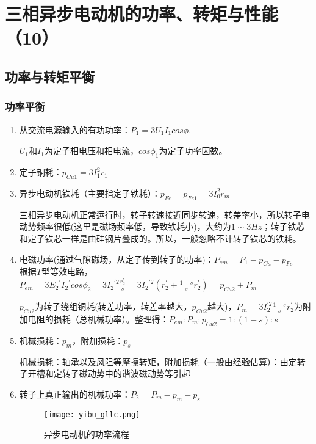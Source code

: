 \documentclass[blue]{elegantnote}
\begin{document}
\chapter{三相异步电动机的功率、转矩与性能（10）}
\section{功率与转矩平衡}
\subsection{功率平衡}
\begin{enumerate}
	\item 从交流电源输入的有功功率：$P_1=3U_1I_1cos\phi_1$
	\begin{note}
		$U_1$和$I_1$为定子相电压和相电流，$cos\phi_1$为定子功率因数。
	\end{note}
	\item 定子铜耗：$p_{Cu1}=3I_1^2r_1$
	\item 异步电动机铁耗（主要指定子铁耗）：$p_{Fe}=p_{Fe1}=3I_0^2r_m$
	\begin{note}
		三相异步电动机正常运行时，转子转速接近同步转速，{\color{main}转差率小，所以转子电动势频率很低}(这里是磁场频率低，导致铁耗小)，大约为$1\sim3Hz$；转子铁芯和定子铁芯一样是由{\color{main}硅钢片叠成的}。所以，{\color{thid}一般忽略不计转子铁芯的铁耗。}
	\end{note}
	\item 电磁功率(通过气隙磁场，从定子传到转子的功率)：$P_{em}=P_1-p_{Cu}-p_{Fe}$
	\\根据$T$型等效电路，$P_{em}=3{E_2}^{'}{I_2}^{'}cos\phi_2=3{I_2}^{'2}\frac{r_2^{'}}{s}=3{I_2}^{'2}(r_2^{'}+\frac{1-s}{s}r_2^{'})=p_{Cu2}+P_m$
	\begin{note}
		$p_{Cu2}$为转子绕组铜耗(转差功率，转差率越大，$p_{Cu2}$越大)，$P_m=3I_2^{'2}\frac{1-s}{s}r_2^{'}$为附加电阻的损耗（总机械功率）。整理得：$P_{em}:P_m:p_{Cu2}=1:(1-s):s$
	\end{note}
	\item 机械损耗：$p_m$，附加损耗：$p_s$
	\begin{note}
		机械损耗：轴承以及风阻等摩擦转矩，附加损耗（一般由经验估算）：由定转子开槽和定转子磁动势中的谐波磁动势等引起
	\end{note}
	\item 转子上真正输出的机械功率：$P_2=P_m-p_m-p_s$  
	\begin{figure}[!hbtp]
		\centering
		\texttt{[image: yibu\_gllc.png]}
		\caption{异步电动机的功率流程\label{figur:yibu_gonglv}}
	\end{figure}
\end{enumerate}
\end{document}
